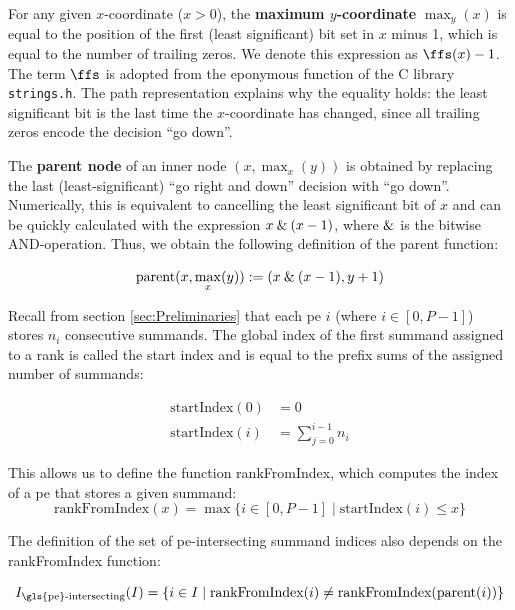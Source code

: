 For any given $x$-coordinate ($x > 0$), the \textbf{maximum $y$-coordinate} $\max_y(x)$ is equal to the position of the first (least significant) bit set in $x$ minus 1,
which is equal to the number of trailing zeros. We denote this expression as $\ffs (x) - 1$. The term $\ffs$ is adopted from the eponymous function
of the C library \texttt{strings.h}.
The path representation explains why the equality holds: the least significant bit is the last time the $x$-coordinate has changed, since all
trailing zeros encode the decision \enquote{go down}.

The \textbf{parent node} of an inner node $(x, \max_x(y))$ is obtained by replacing the last (least-significant) \enquote{go right and down} decision
with \enquote{go down}. Numerically, this is equivalent to cancelling the least significant bit of $x$ and can be quickly calculated with the
expression $x \mathbin{\&} (x - 1)$, where $\mathbin{\&}$ is the bitwise AND-operation. Thus, we obtain the following definition of the parent function:

\begin{equation}
\label{eq:parent}
\textrm{parent} (x, \max_x (y) ) := (x \mathbin{\&} (x - 1), y + 1)
\end{equation}

Recall from section \ref{sec:Preliminaries} that each \gls{pe} $i$ (where $i \in [0, P - 1]$) stores $n_i$ consecutive summands.
The global index of the first summand assigned to a rank is called the start index and is equal to the prefix sums of the assigned number of summands:

\begin{align}
\textrm{startIndex} (0) &= 0 \\
\textrm{startIndex} (i) &= \sum_{j = 0}^{i - 1} n_i
\label{eq:startIndex}
\end{align}

This allows us to define the function rankFromIndex, which computes the index of a \gls{pe} that stores a given summand:
\begin{equation}
\textrm{rankFromIndex} (x) = \max \{i \in [0, P - 1] \;|\; \textrm{startIndex} (i) \leq x \}
\end{equation}

The definition of the set of \gls{pe}-intersecting summand indices also depends on the rankFromIndex function:

\newcommand{\rankIntersectingIndices}{I_{\textrm{\gls{pe}-intersecting}}}
\begin{equation}
\rankIntersectingIndices (I) = \{i \in I \;|\; \textrm{rankFromIndex} (i) \neq \textrm{rankFromIndex} (\textrm{parent} (i)) \}
\end{equation}

